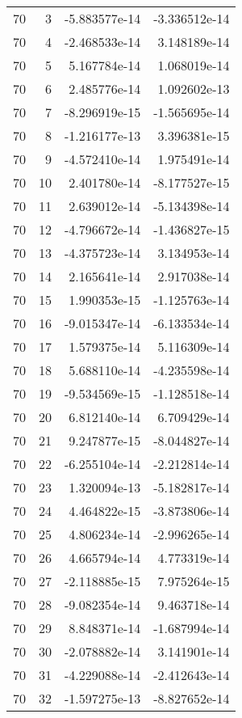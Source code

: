 \begin{tabular}{rrrr}
  70 &    3 & -5.883577e-14 & -3.336512e-14 \\
  70 &    4 & -2.468533e-14 &  3.148189e-14 \\
  70 &    5 &  5.167784e-14 &  1.068019e-14 \\
  70 &    6 &  2.485776e-14 &  1.092602e-13 \\
  70 &    7 & -8.296919e-15 & -1.565695e-14 \\
  70 &    8 & -1.216177e-13 &  3.396381e-15 \\
  70 &    9 & -4.572410e-14 &  1.975491e-14 \\
  70 &   10 &  2.401780e-14 & -8.177527e-15 \\
  70 &   11 &  2.639012e-14 & -5.134398e-14 \\
  70 &   12 & -4.796672e-14 & -1.436827e-15 \\
  70 &   13 & -4.375723e-14 &  3.134953e-14 \\
  70 &   14 &  2.165641e-14 &  2.917038e-14 \\
  70 &   15 &  1.990353e-15 & -1.125763e-14 \\
  70 &   16 & -9.015347e-14 & -6.133534e-14 \\
  70 &   17 &  1.579375e-14 &  5.116309e-14 \\
  70 &   18 &  5.688110e-14 & -4.235598e-14 \\
  70 &   19 & -9.534569e-15 & -1.128518e-14 \\
  70 &   20 &  6.812140e-14 &  6.709429e-14 \\
  70 &   21 &  9.247877e-15 & -8.044827e-14 \\
  70 &   22 & -6.255104e-14 & -2.212814e-14 \\
  70 &   23 &  1.320094e-13 & -5.182817e-14 \\
  70 &   24 &  4.464822e-15 & -3.873806e-14 \\
  70 &   25 &  4.806234e-14 & -2.996265e-14 \\
  70 &   26 &  4.665794e-14 &  4.773319e-14 \\
  70 &   27 & -2.118885e-15 &  7.975264e-15 \\
  70 &   28 & -9.082354e-14 &  9.463718e-14 \\
  70 &   29 &  8.848371e-14 & -1.687994e-14 \\
  70 &   30 & -2.078882e-14 &  3.141901e-14 \\
  70 &   31 & -4.229088e-14 & -2.412643e-14 \\
  70 &   32 & -1.597275e-13 & -8.827652e-14 \\

\end{tabular}
